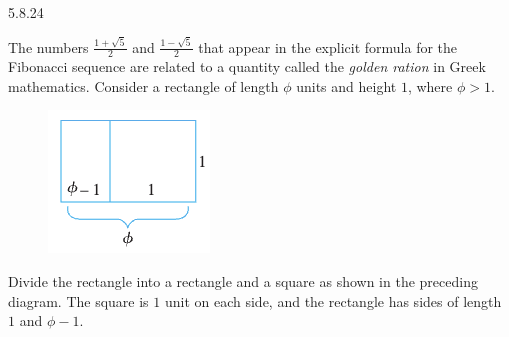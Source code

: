 \documentclass[11pt]{article}
\begin{document}
\begin{question}
    {5.8.24}
    {
        The numbers $\frac{1 + \sqrt{5}}{2}$ and $\frac{1 - \sqrt{5}}{2}$ that appear in the explicit formula for the Fibonacci sequence are related to a quantity called the \textit{golden ration} in Greek mathematics. Consider a rectangle of length $\phi$ units and height $1$, where $\phi > 1$. \\
        \begin{figure}[h]
            \centering
            \includegraphics{5.8.24}
        \end{figure}
        \vspace{-\baselineskip}
        Divide the rectangle into a rectangle and a square as shown in the preceding diagram. The square is $1$ unit on each side, and the rectangle has sides of length $1$ and $\phi - 1$.
    }
\end{question}
\end{document}
